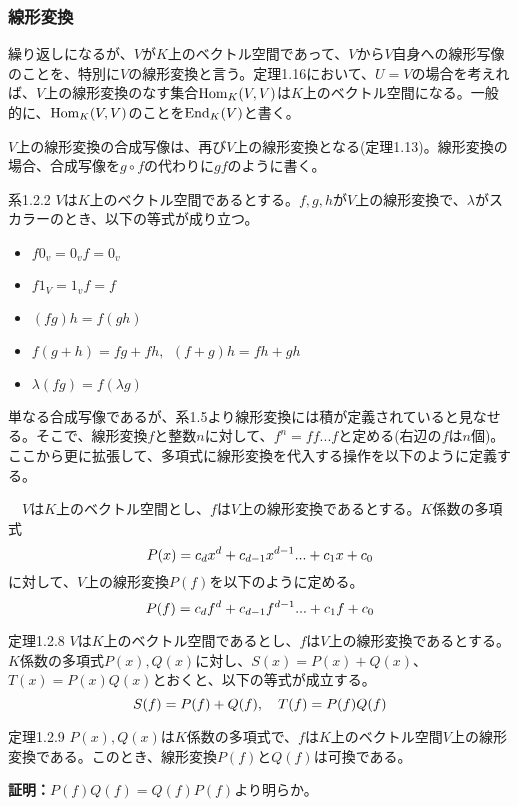\documentclass[dvipdfmx, 9pt, a4paper]{jsarticle}
\numberwithin{equation}{subsection}
\begin{document}
\subsubsection{線形変換}
繰り返しになるが、$V$が$K$上のベクトル空間であって、$V$から$V$自身への線形写像のことを、特別に$V$の線形変換と言う。定理1.16において、$U=V$の場合を考えれば、$V$上の線形変換のなす集合${\rm Hom}_K(V, V)$は$K$上のベクトル空間になる。一般的に、${\rm Hom}_K(V, V)$のことを${\rm End}_K(V)$と書く。\par
$V$上の線形変換の合成写像は、再び$V$上の線形変換となる(定理1.13)。線形変換の場合、合成写像を$g \circ f$の代わりに$gf$のように書く。
\begin{itembox}[l]{系1.2.2}
 $V$は$K$上のベクトル空間であるとする。$f, g, h$が$V$上の線形変換で、$\lambda$がスカラーのとき、以下の等式が成り立つ。
\begin{itemize}
\item $f0_v=0_vf=0_v$
\item $f1_V=1_vf=f$
\item $(fg)h=f(gh)$
\item $f(g+h)=fg+fh,~~(f+g)h=fh+gh$
\item $\lambda(fg)=f(\lambda g)$
\end{itemize}
\end{itembox}\par
単なる合成写像であるが、系1.5より線形変換には積が定義されていると見なせる。そこで、線形変換$f$と整数$n$に対して、$f^n=ff...f$と定める(右辺の$f$は$n$個)。ここから更に拡張して、多項式に線形変換を代入する操作を以下のように定義する。
\begin{tcolorbox}[title=線形変換の多項式への代入]
　$V$は$K$上のベクトル空間とし、$f$は$V$上の線形変換であるとする。$K$係数の多項式
\begin{equation}
P(x)=c_dx^d+c_{d-1}x^{d-1}...+c_1x+c_0 \notag
\end{equation}
に対して、$V$上の線形変換$P(f)$を以下のように定める。
\begin{equation}
P(f)=c_df^d+c_{d-1}f^{d-1}...+c_1f+c_0 \notag
\end{equation}
\end{tcolorbox}
\begin{itembox}[l]{定理1.2.8}
$V$は$K$上のベクトル空間であるとし、$f$は$V$上の線形変換であるとする。$K$係数の多項式$P(x), Q(x)$に対し、$S(x)=P(x)+Q(x)$、$T(x)=P(x)Q(x)$とおくと、以下の等式が成立する。
\begin{equation}
S(f)=P(f)+Q(f),~~~T(f)=P(f)Q(f) \notag
\end{equation}
\end{itembox}
\begin{itembox}[l]{定理1.2.9}
$P(x), Q(x)$は$K$係数の多項式で、$f$は$K$上のベクトル空間$V$上の線形変換である。このとき、線形変換$P(f)$と$Q(f)$は可換である。
\end{itembox}
{\bf 証明：}$P(f)Q(f)=Q(f)P(f)$より明らか。
\end{document}

